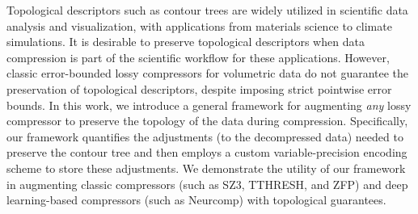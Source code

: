 Topological descriptors such as contour trees are widely utilized in scientific data analysis and visualization, with applications from materials science to climate simulations. 
It is desirable to preserve topological descriptors when data compression is part of the scientific workflow for these applications. 
However, classic error-bounded lossy compressors for volumetric data do not guarantee the preservation of topological descriptors, despite imposing strict pointwise error bounds. 
In this work, we introduce a general framework for augmenting \emph{any} lossy compressor to preserve the topology of the data during compression. 
Specifically, our framework quantifies the adjustments (to the decompressed data) needed to preserve the contour tree and then employs a custom variable-precision encoding scheme to store these adjustments. 
We demonstrate the utility of our framework in augmenting classic compressors (such as SZ3, TTHRESH, and ZFP) and deep learning-based compressors (such as Neurcomp) with topological guarantees.